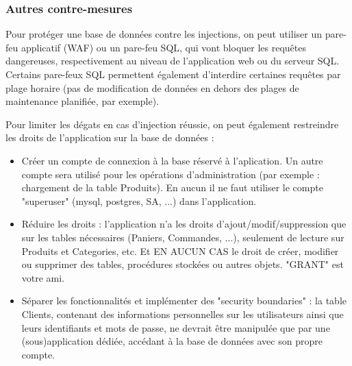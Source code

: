 \subsubsection{Autres contre-mesures}\label{vulnerabilites:web:sqli:countermeasures:others}

Pour protéger une base de données contre les injections, on peut utiliser un pare-feu applicatif (WAF) ou un pare-feu SQL, qui vont bloquer les requêtes dangereuses, respectivement au niveau de l'application web ou du serveur SQL. Certains pare-feux SQL permettent également d'interdire certaines requêtes par plage horaire (pas de modification de données en dehors des plages de maintenance planifiée, par exemple).
\begin{tabbing}
\end{tabbing}

Pour limiter les dégats en cas d'injection réussie, on peut également restreindre les droits de l'application sur la base de données :
\begin{tabbing}
\end{tabbing}
\begin{itemize}
\item Créer un compte de connexion à la base réservé à l'aplication. Un autre compte sera utilisé pour les opérations d'administration (par exemple : chargement de la table Produits). En aucun il ne faut utiliser le compte "superuser" (mysql, postgres, SA, ...) dans l'application.
\item Réduire les droits : l'application n'a les droits d'ajout/modif/suppression que sur les tables nécessaires (Paniers, Commandes, ...), seulement de lecture sur Produits et Categories, etc. Et EN AUCUN CAS le droit de créer, modifier ou supprimer des tables, procédures stockées ou autres objets. "GRANT" est votre ami.
\item Séparer les fonctionnalités et implémenter des "security boundaries" : la table Clients, contenant des informations personnelles sur les utilisateurs ainsi que leurs identifiants et mots de passe, ne devrait être manipulée que par une (sous)application dédiée, accédant à la base de données avec son propre compte.
\end{itemize}

\endinput
